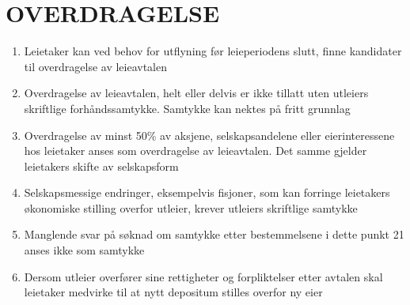 \section{OVERDRAGELSE}


    \begin{enumerate}

        \item Leietaker kan ved behov for utflyning før leieperiodens slutt, finne kandidater til overdragelse av leieavtalen

        \item Overdragelse av leieavtalen, helt eller delvis er ikke tillatt uten utleiers skriftlige forhåndssamtykke.
        Samtykke kan nektes på fritt grunnlag

        \item Overdragelse av minst 50\% av aksjene, selskapsandelene eller eierinteressene hos leietaker anses som
        overdragelse av leieavtalen. Det samme gjelder leietakers skifte av selskapsform

        \item Selskapsmessige endringer, eksempelvis fisjoner, som kan forringe leietakers økonomiske stilling
        overfor utleier, krever utleiers skriftlige samtykke

        \item Manglende svar på søknad om samtykke etter bestemmelsene i dette punkt 21 anses ikke som
        samtykke

        \item Dersom utleier overfører sine rettigheter og forpliktelser etter avtalen skal leietaker medvirke til at nytt depositum stilles overfor ny eier

    \end{enumerate}
